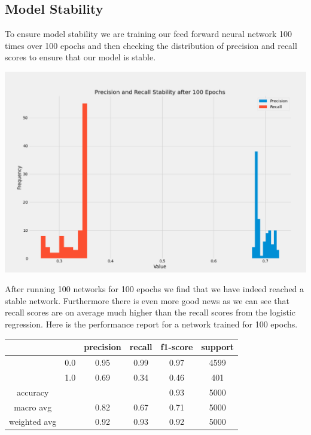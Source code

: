 \documentclass[12pt]{article}
\begin{document}
	
	\subsection{Model Stability}
	
	To ensure model stability we are training our feed forward neural network 100 times over 100 epochs and then checking the distribution of precision and recall scores to ensure that our model is stable. 
	
	\begin{center}
		\includegraphics[scale=0.4]{../notebooks/StableNetwork.png}
	\end{center}
	
	After running 100 networks for 100 epochs we find that we have indeed reached a stable network. Furthermore there is even more good news as we can see that recall scores are on average much higher than the recall scores from the logistic regression. Here is the performance report for a network trained for 100 epochs. 
	
	\begin{tabular}{c|c|c|c|c|c}
		\hline
		& 		& 	precision &  recall  & f1-score   & support \\ \hline
		
		&  0.0	&		0.95 &     0.99   &  0.97   &  4599 \\ \hline
		&  1.0  &		0.69 &     0.34   &  0.46   &   401 \\ \hline
		
		accuracy    & & & &                       		  0.93   &   5000 \\ \hline
		macro avg   & &   			0.82   &   0.67  &    0.71   &   5000  \\ \hline
		weighted avg  & &   		0.92   &   0.93  &    0.92   &   5000 \\ \hline
	\end{tabular}
	
\end{document}
